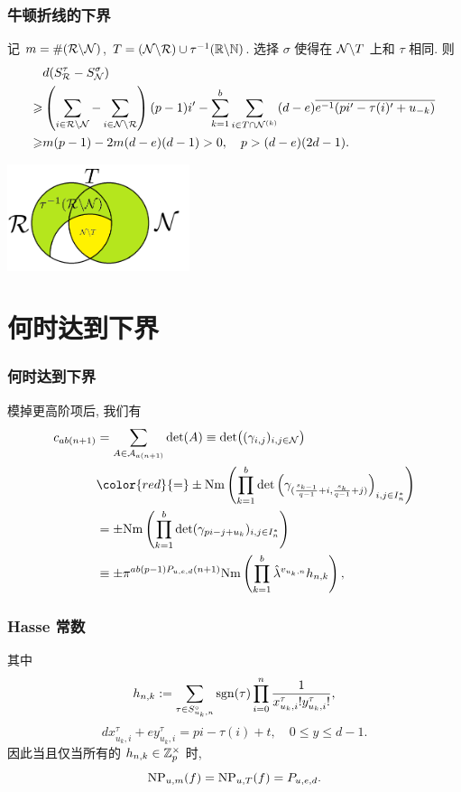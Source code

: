 \documentclass[aspectratio=169,handout]{ctexbeamer}
\begin{document}
\begin{frame}
\frametitle{牛顿折线的下界}
记 $m=\#({\mathcal{R}}\backslash {\mathcal{N}})$, $T=({\mathcal{N}}\backslash {\mathcal{R}})\cup\tau^{-1}({\mathbb{R}}\backslash {\mathbb{N}})$.
选择 $\sigma$ 使得在 ${\mathcal{N}}\backslash T$ 上和 $\tau$ 相同. 则
	\[\begin{split}
&d(S_{\mathcal{R}}^\tau-S_{\mathcal{N}}^\sigma)\\
\geqslant&\left(\sum_{i\in {\mathcal{R}}\backslash{\mathcal{N}}}-\sum_{i\in{\mathcal{N}}\backslash{\mathcal{R}}}\right)(p-1)i'-\sum_{k=1}^b\sum_{i\in T\cap{\mathcal{N}}^{(k)}}(d-e)\overline{e^{-1}(pi'-\tau(i)'+u_{-k})}\\
\geqslant&m(p-1)-2m(d-e)(d-1)>0,\quad p> (d-e)(2d-1).
\end{split}\]
\begin{center}
\includegraphics[width=0.4\textwidth]{2021qingdao.png}
\end{center}
\end{frame}

\section{何时达到下界}

\begin{frame}
\frametitle{何时达到下界}
模掉更高阶项后, 我们有
	\[\begin{split}
	c_{ab(n+1)}&=\sum_{A\in\CA_{a(n+1)}}\det(A)\equiv \det\bigl((\gamma_{i,j})_{i,j\in \CN}\bigr)\\
	&{\color{red}{=}}\pm\Nm\left(\prod_{k=1}^b\det\left(\gamma_{(\frac{s_{k-1}}{q-1}+i,\frac{s_k}{q-1}+j)}\right)_{i,j\in I_n^*}\right)\\
	&=\pm \Nm\left(\prod_{k=1}^b\det(\gamma_{pi-j+u_k})_{i,j\in I_n^*}\right)\\
	&\equiv\pm\pi^{ab(p-1)P_{u,e,d}(n+1)}\Nm\left(\prod_{k=1}^b \hat\lambda^{v_{u_k,n}} h_{n,k}\right),
	\end{split}\]
\end{frame}


\begin{frame}
\frametitle{Hasse 常数}
其中
	\[
	h_{n,k}:=\sum_{\tau\in S_{u_k,n}^\circ}\operatorname{sgn}(\tau)\prod_{i=0}^n\frac{1}{x_{u_k,i}^\tau!y_{u_k,i}^\tau!},
	\]
	\[dx_{u_k,i}^\tau+ey_{u_k,i}^\tau=pi-\tau(i)+t,\quad 0\le y\le d-1.\]
因此当且仅当所有的 $h_{n,k}\in{\mathbb{Z}}_p^\times$ 时,
	\[{\mathrm{NP}}_{u,m}(f)={\mathrm{NP}}_{u,T}(f)=P_{u,e,d}.\]
\end{frame}
\end{document}
